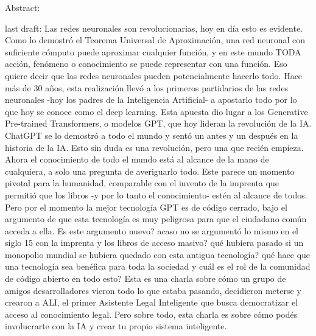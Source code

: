 Abstract: 



last draft: 
Las redes neuronales son revolucionarias, hoy en día esto es evidente.
Como lo demostró el Teorema Universal de Aproximación, una red neuronal con suficiente cómputo puede aproximar cualquier función, y en este mundo TODA acción, fenómeno o conocimiento se puede representar con una función. Eso quiere decir que las redes neuronales pueden potencialmente hacerlo todo.
Hace más de 30 años, esta realización llevó a los primeros partidarios de las redes neuronales -hoy los padres de la Inteligencia Artificial- a apostarlo todo por lo que hoy se conoce como el deep learning. Esta apuesta dio lugar a los Generative Pre-trained Transformers, o modelos GPT, que hoy lideran la revolución de la IA. ChatGPT se lo demostró a todo el mundo y sentó un antes y un después en la historia de la IA. Esto sin duda es una revolución, pero una que recién empieza. Ahora el conocimiento de todo el mundo está al alcance de la mano de cualquiera, a solo una pregunta de averiguarlo todo. Este parece un momento pivotal para la humanidad, comparable con el invento de la imprenta que permitió que los libros -y por lo tanto el conocimiento- estén al alcance de todos.
Pero por el momento la mejor tecnología GPT es de código cerrado, bajo el argumento de que esta tecnología es muy peligrosa para que el ciudadano común acceda a ella. Es este argumento nuevo? acaso no se argumentó lo mismo en el siglo 15 con la imprenta y los libros de acceso masivo? qué hubiera pasado si un monopolio mundial se hubiera quedado con esta antigua tecnología? qué hace que una tecnología sea benéfica para toda la sociedad y cuál es el rol de la comunidad de código abierto en todo esto?
Esta es una charla sobre cómo un grupo de amigos desarrolladores vieron todo lo que estaba pasando, decidieron meterse y crearon a ALI, el primer Asistente Legal Inteligente que busca democratizar el acceso al conocimiento legal.
Pero sobre todo, esta charla es sobre cómo podés involucrarte con la IA y crear tu propio sistema inteligente.



